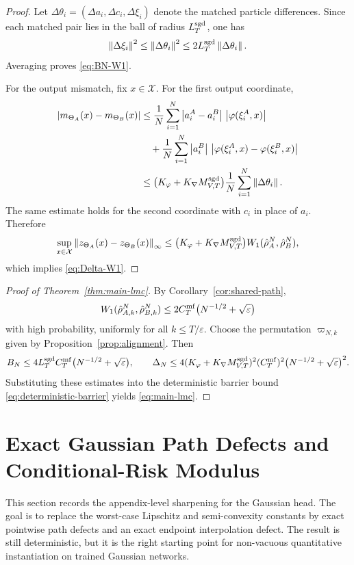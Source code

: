 \documentclass[11pt]{article}
\theoremstyle{definition}
\newcommand{\norm}[1]{\left\lVert #1 \right\rVert}
\newcommand{\abs}[1]{\left\lvert #1 \right\rvert}
\newcommand{\mc}[1]{\mathcal{#1}}
\begin{document}
\begin{proof}
Let $\Delta\theta_i=(\Delta a_i,\Delta c_i,\Delta\xi_i)$ denote the matched
particle differences. Since each matched pair lies in the ball of radius
$L_T^{\rm sgd}$, one has
\[
  \norm{\Delta\xi_i}^2
  \le
  \norm{\Delta\theta_i}^2
  \le
  2L_T^{\rm sgd}\norm{\Delta\theta_i}.
\]
Averaging proves \eqref{eq:BN-W1}.

For the output mismatch, fix $x\in\mc{X}$. For the first output coordinate,
\begin{align*}
  \abs{m_{\Theta_A}(x)-m_{\Theta_B}(x)}
  &\le
  \frac1N\sum_{i=1}^N
  \abs{a_i^A-a_i^B}\,\abs{\varphi(\xi_i^A,x)}
  \\
  &\quad+
  \frac1N\sum_{i=1}^N
  \abs{a_i^B}\,\abs{\varphi(\xi_i^A,x)-\varphi(\xi_i^B,x)}
  \\
  &\le
  \bigl(K_\varphi+K_\nabla M_{V,T}^{\rm sgd}\bigr)
  \frac1N\sum_{i=1}^N \norm{\Delta\theta_i}.
\end{align*}
The same estimate holds for the second coordinate with $c_i$ in place of
$a_i$. Therefore
\[
  \sup_{x\in\mc{X}}
  \norm{z_{\Theta_A}(x)-z_{\Theta_B}(x)}_\infty
  \le
  \bigl(K_\varphi+K_\nabla M_{V,T}^{\rm sgd}\bigr)
  W_1(\hat\rho_A^N,\hat\rho_B^N),
\]
which implies \eqref{eq:Delta-W1}.
\end{proof}

\begin{proof}[Proof of Theorem~\ref{thm:main-lmc}]
By Corollary~\ref{cor:shared-path},
\[
  W_1(\hat\rho_{A,k}^N,\hat\rho_{B,k}^N)
  \le
  2C_T^{\rm mf}\bigl(N^{-1/2}+\sqrt{\varepsilon}\bigr)
\]
with high probability, uniformly for all $k\le T/\varepsilon$. Choose the
permutation $\varpi_{N,k}$ given by Proposition~\ref{prop:alignment}. Then
\[
  B_N
  \le
  4L_T^{\rm sgd}C_T^{\rm mf}\bigl(N^{-1/2}+\sqrt{\varepsilon}\bigr),
  \qquad
  \Delta_N
  \le
  4(K_\varphi+K_\nabla M_{V,T}^{\rm sgd})^2
  (C_T^{\rm mf})^2\bigl(N^{-1/2}+\sqrt{\varepsilon}\bigr)^2.
\]
Substituting these estimates into the deterministic barrier bound
\eqref{eq:deterministic-barrier} yields
\eqref{eq:main-lmc}.
\end{proof}

\section{Exact Gaussian Path Defects and Conditional-Risk Modulus}
\label{sec:exact-gaussian-modulus}

This section records the appendix-level sharpening for the Gaussian head. The
goal is to replace the worst-case Lipschitz and
semi-convexity constants by exact pointwise path defects and an exact endpoint
interpolation defect. The result is still deterministic, but it is the right
starting point for non-vacuous quantitative instantiation on trained Gaussian
networks.
\end{document}
